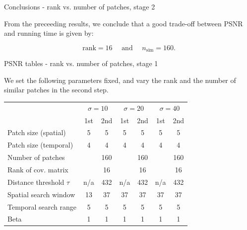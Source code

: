 \documentclass[mathserif, 8pt]{beamer}
\makeatletter
\newcounter{multipleslide}
\newcommand{\multipleframe}{%
\setcounter{multipleslide}{\value{framenumber}}
\stepcounter{multipleslide}
\patchcmd{\beamer@@tmpl@footline}%
	{\insertframenumber}%
	{\themultipleslide}%
	{}%
	{}%
}
\newcommand{\restoreframe}{%
\patchcmd{\beamer@@tmpl@footline}%
	{\themultipleslide}%
	{\insertframenumber}%
	{}%
	{}%
\setcounter{framenumber}{\value{multipleslide}}%
}
\makeatother
\begin{document}
\begin{frame}{Conclusions - rank vs. number of patches, stage 2}

	From the preceeding results, we conclude that a good trade-off between PSNR and running time
	is given by:

	\[\text{rank} = 16 \quad\text{ and }\quad n_{\text{sim}} = 160.\]

\end{frame}
\restoreframe

\multipleframe
\begin{frame}{PSNR tables - rank vs. number of patches, stage 1}

	We set the following parameters fixed, and vary the rank and the number of similar
	patches in the second step.

	\begin{center}
	\begin{tabular}{l | c c | c c | c c }
		& \multicolumn{2}{c|}{$\sigma = 10$} 
		& \multicolumn{2}{c|}{$\sigma = 20$} 
		& \multicolumn{2}{c}{$\sigma = 40$} \\
		                            & 1st  & 2nd  & 1st  & 2nd  & 1st  & 2nd \\\hline\hline
		Patch size (spatial)        &  5   &   5  &  5   &   5  &  5   &   5 \\
		Patch size (temporal)       &  4   &   4  &  4   &   4  &  4   &   4 \\
		Number of patches           &      & 160  &      & 160  &      & 160 \\
		Rank of cov. matrix         &      &  16  &      &  16  &      & 16  \\
		Distance threshold $\tau$   & n/a  & 432  & n/a  & 432  & n/a  & 432 \\
		Spatial search window       & 13   & 37   & 37   & 37   & 37   & 37  \\
		Temporal search range       & 5    & 5    & 5    & 5    & 5    & 5   \\\hline
		Beta                        & 1    & 1    & 1    & 1    & 1    & 1   \\\hline
	\end{tabular}
	\end{center}

	\bigskip


\end{frame}
\end{document}
